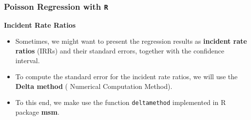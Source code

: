 \documentclass[00-GLMregslides.tex]{subfiles}
\begin{document}
\begin{frame}[fragile]

\frametitle{Poisson Regression with \texttt{R}}
\Large 
\textbf{Incident Rate Ratios}
\begin{itemize}
\item Sometimes, we might want to present the regression results as \textbf{incident rate ratios} (IRRs) and 
their standard errors, together with the confidence interval. 
\item To compute the standard error for the incident rate ratios, we will use the \textbf{Delta method} ( Numerical Computation Method). 
\item To this end, we make use the function \texttt{deltamethod} implemented in R package \textbf{msm}.
\end{itemize}
\end{frame}
\end{document}
